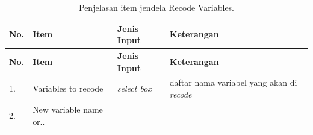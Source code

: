 \documentclass[12pt,]{krantz}
\begin{document}
\begin{longtable}[]{@{}llll@{}}
\caption{\label{tab:recodevar2} Penjelasan item jendela Recode Variables.}\tabularnewline
\toprule
\begin{minipage}[b]{0.07\columnwidth}\raggedright
\textbf{No.}\strut
\end{minipage} & \begin{minipage}[b]{0.23\columnwidth}\raggedright
\textbf{Item}\strut
\end{minipage} & \begin{minipage}[b]{0.15\columnwidth}\raggedright
\textbf{Jenis Input}\strut
\end{minipage} & \begin{minipage}[b]{0.43\columnwidth}\raggedright
\textbf{Keterangan}\strut
\end{minipage}\tabularnewline
\midrule
\endfirsthead
\toprule
\begin{minipage}[b]{0.07\columnwidth}\raggedright
\textbf{No.}\strut
\end{minipage} & \begin{minipage}[b]{0.23\columnwidth}\raggedright
\textbf{Item}\strut
\end{minipage} & \begin{minipage}[b]{0.15\columnwidth}\raggedright
\textbf{Jenis Input}\strut
\end{minipage} & \begin{minipage}[b]{0.43\columnwidth}\raggedright
\textbf{Keterangan}\strut
\end{minipage}\tabularnewline
\midrule
\endhead
\begin{minipage}[t]{0.07\columnwidth}\raggedright
1.\strut
\end{minipage} & \begin{minipage}[t]{0.23\columnwidth}\raggedright
Variables to recode\strut
\end{minipage} & \begin{minipage}[t]{0.15\columnwidth}\raggedright
\emph{select box}\strut
\end{minipage} & \begin{minipage}[t]{0.43\columnwidth}\raggedright
daftar nama variabel yang akan di \emph{recode}\strut
\end{minipage}\tabularnewline
\begin{minipage}[t]{0.07\columnwidth}\raggedright
2.\strut
\end{minipage} & \begin{minipage}[t]{0.23\columnwidth}\raggedright
New variable name or..\strut
\end{minipage} & \begin{minipage}[t]{0.15\columnwidth}\raggedright

\end{minipage}
\end{longtable}
\end{document}
